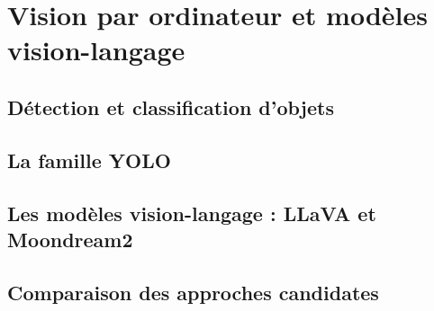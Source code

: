 
\section{Vision par ordinateur et modèles vision-langage}


\subsection{Détection et classification d'objets}

\subsection{La famille YOLO}

\subsection{Les modèles vision-langage : LLaVA et Moondream2}

\subsection{Comparaison des approches candidates}
